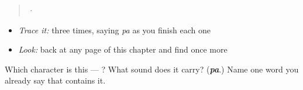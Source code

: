 \begin{quote}
  ·  
\end{quote}

\begin{itemize}
\raggedright
  \item \emph{Trace it:}  three times, saying \emph{pa} as you finish each one
  \item \emph{Look:} back at any page of this chapter and find  once more
\end{itemize}

\begin{tcolorbox}[breakable,colback=teal!4,colframe=teal!35!black,title={Before you move on}]
Which character is this — ? What sound does it carry? (\emph{\textbf{pa}}.) Name one word you already say that contains it.
\end{tcolorbox}
